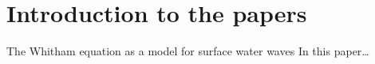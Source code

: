 \chapter{Introduction to the papers}

%
%
{The Whitham equation as a model for surface water waves}
{In this paper\ldots}


